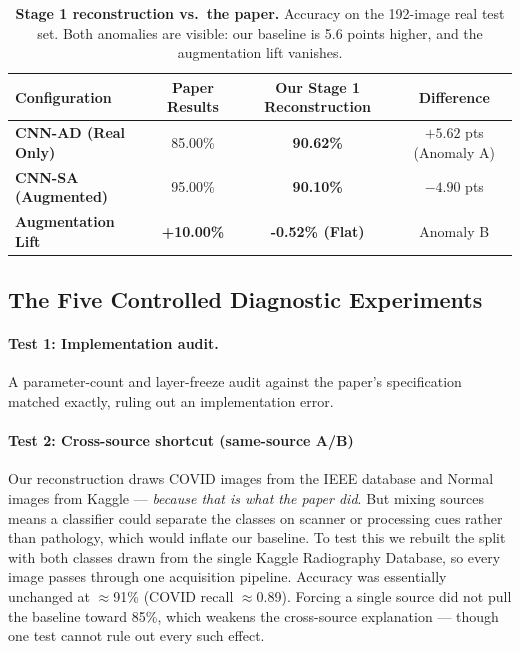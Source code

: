 \documentclass[11pt]{article}
\begin{document}
\begin{table}[htbp]
\centering
\caption{\textbf{Stage 1 reconstruction vs.\ the paper.} Accuracy on the 192-image real test set. Both anomalies are visible: our baseline is 5.6 points higher, and the augmentation lift vanishes.}
\label{tab:reconstruction}
\begin{tabular}{@{}lccc@{}}
\toprule
\textbf{Configuration} & \textbf{Paper Results} & \textbf{Our Stage 1 Reconstruction} & \textbf{Difference} \\
\midrule
\textbf{CNN-AD (Real Only)} & 85.00\% & \textbf{90.62\%} & $+5.62$ pts (Anomaly A) \\
\textbf{CNN-SA (Augmented)} & 95.00\% & \textbf{90.10\%} & $-4.90$ pts \\
\midrule
\textbf{Augmentation Lift} & \textbf{+10.00\%} & \textbf{-0.52\% (Flat)} & Anomaly B \\
\bottomrule
\end{tabular}
\end{table}

\subsection{The Five Controlled Diagnostic Experiments}

\paragraph{Test 1: Implementation audit.} A parameter-count and layer-freeze audit against the paper's specification matched exactly, ruling out an implementation error.

\paragraph{Test 2: Cross-source shortcut (same-source A/B)}
Our reconstruction draws COVID images from the IEEE database and Normal images from Kaggle --- \emph{because that is what the paper did}. But mixing sources means a classifier could separate the classes on scanner or processing cues rather than pathology, which would inflate our baseline. To test this we rebuilt the split with both classes drawn from the single Kaggle Radiography Database, so every image passes through one acquisition pipeline. Accuracy was essentially unchanged at $\approx$91\% (COVID recall $\approx$0.89). Forcing a single source did not pull the baseline toward 85\%, which weakens the cross-source explanation --- though one test cannot rule out every such effect.
\end{document}
